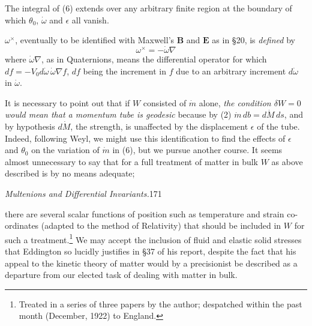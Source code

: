 \documentclass[11pt]{article}
\begin{document}
\indent [\emph{Added October, 1921.}---A consequence of remarks which occur below is so obvious that it is singular that only now have I happened to recognise it. If it is assumed that for the first two variations $(\delta\theta=\theta_0$ and $\delta\dot\omega=V_2\nabla v^\bullet)$ the stationary condition (6) holds; then \emph{it follows as a mathematical deduction} that the stationary condition also holds for the third variation $(\delta p=\epsilon)$ which shifts the tubes. Clearly then our postulated principle of stationary action should not include the \emph{assumption} of the stationary condition for the third variation. The reader will easily justify the assertions that have just been made, if he will take as the proof of the equation $T_{\xi}^{(t)}\zeta=0$, the indication of a proof, immediately following the identity (35) below. This equation $T_{\xi}^{(t)}\zeta=0$ is virtually the necessary and sufficient condition for the existence of the stationary condition under the variation $\delta p=\epsilon$.]

\indent The integral of (6) extends over any arbitrary finite region at the boundary of which $\theta_0$, $\dot\omega$ and $\epsilon$ all vanish.

\indent $\omega^\times$, eventually to be identified with Maxwell's $\mathbf{B}$ and $\mathbf{E}$ as in §20, is \emph{defined} by
\begin{equation}
  \omega^\times=-\dot\omega\nabla
  \tag{12}
\end{equation}
where $\dot\omega\nabla$, as in Quaternions, means the differential operator for which $df=-V_0d\dot\omega\,\dot\omega\nabla f$, $df$ being the increment in $f$ due to an arbitrary increment $d\dot\omega$ in $\dot\omega$.

\indent It is necessary to point out that if $W$ consisted of $\dot m$ alone, \emph{the condition $\delta W=0$ would mean that a momentum tube is geodesic} because by (2) $\dot m\,db=d\dot M\,ds$, and by hypothesis $d\dot M$, the strength, is unaffected by the displacement $\epsilon$ of the tube. Indeed, following Weyl, we might use this identification to find the effects of $\epsilon$ and $\theta_0$ on the variation of $\dot m$ in (6), but we pursue another course. It seems almost unnecessary to say that for a full treatment of matter in bulk $W$ as above described is by no means adequate;

\newpage\thispagestyle{empty}\begin{center}\textit{Multenions and Differential Invariants.}\hfill 171\end{center}
there are several scalar functions of position such as temperature and strain co-ordinates (adapted to the method of Relativity) that should be included in $W$ for such a treatment.\footnote{Treated in a series of three papers by the author; despatched within the past month (December, 1922) to England.} We may accept the inclusion of fluid and elastic solid stresses that Eddington so lucidly justifies in §37 of his report, despite the fact that his appeal to the kinetic theory of matter would by a precisionist be described as a departure from our elected task of dealing with matter in bulk.
\end{document}
